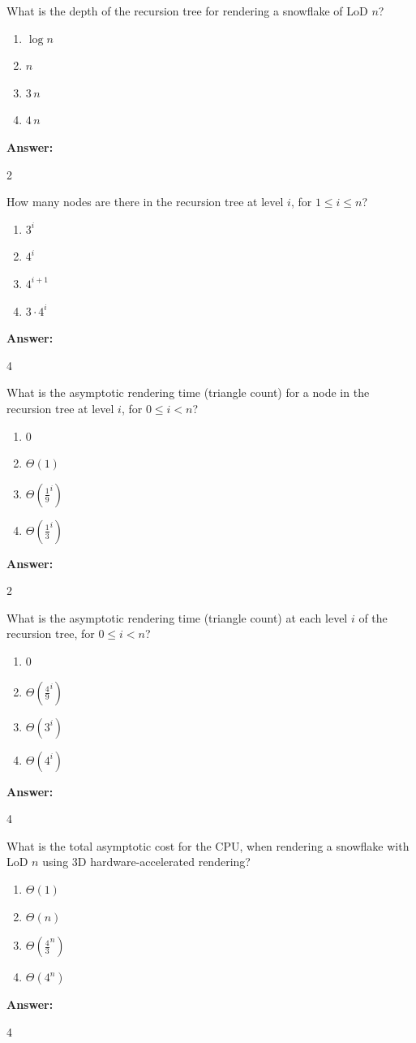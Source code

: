 \documentclass[12pt,twoside]{article}
\newcommand{\answer}{
 \par\medskip
 \textbf{Answer:}
}
\newcommand{\answerIa}{ \answer
2
}
\newcommand{\answerIb}{ \answer
4
}
\newcommand{\answerIc}{ \answer
2
}
\newcommand{\answerId}{ \answer
4
}
\newcommand{\answerIe}{ \answer
4
}
\begin{document}
\begin{problems}
\begin{problemparts}
  \problempart {} What is the depth of the recursion tree for rendering a
  snowflake of LoD $n$?
    \begin{enumerate}
      \item $\log n$
      \item $n$
      \item $3 \, n$
      \item $4 \, n$
    \end{enumerate}
\answerIa

  \problempart {} How many nodes are there in the recursion tree at level
  $i$, for $1 \le i \le n$?
    \begin{enumerate}
     \item $3 ^ i$
      \item $4 ^ i$
      \item $4 ^ {i + 1}$
      \item $3 \cdot 4 ^ i$
    \end{enumerate}
\answerIb
    
  \problempart {} What is the asymptotic rendering time (triangle count) for a
  node in the recursion tree at level $i$, for $0 \le i < n$?
    \begin{enumerate}
      \item $0$
      \item $\Theta(1)$
      \item $\Theta(\frac{1}{9}^i)$
      \item $\Theta(\frac{1}{3}^i)$
    \end{enumerate}
\answerIc 

  \problempart {} What is the asymptotic rendering time (triangle count) at
  each level $i$ of the recursion tree, for $0 \le i < n$?
    \begin{enumerate}
      \item 0
      \item $\Theta(\frac{4}{9} ^ i)$
      \item $\Theta(3 ^ i)$
      \item $\Theta(4 ^ i)$
    \end{enumerate}
\answerId

  \problempart {} What is the total asymptotic cost for the CPU, when rendering
  a snowflake with LoD $n$ using 3D hardware-accelerated rendering?
    \begin{enumerate}
      \item $\Theta(1)$
      \item $\Theta(n)$
      \item $\Theta(\frac{4}{3}^n)$
      \item $\Theta(4^n)$
    \end{enumerate}
\answerIe
\end{problemparts}


\end{problems}
\end{document}
